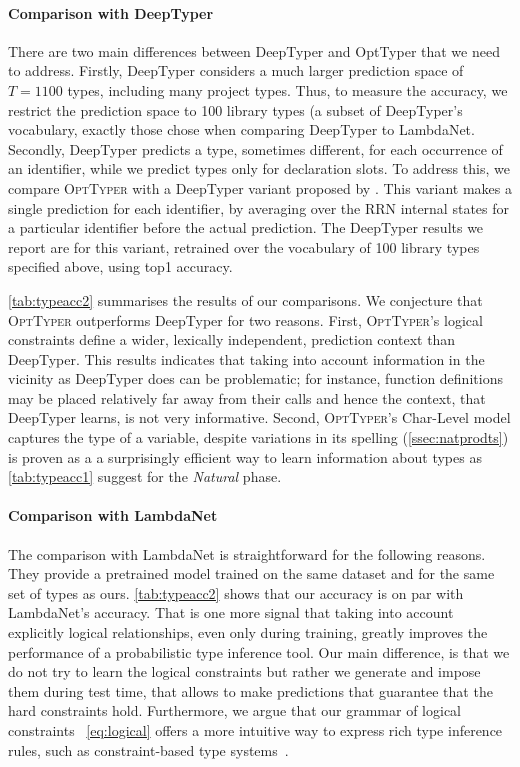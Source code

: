 \documentclass[acmsmall, review, anonymous]{acmart}\settopmatter{printfolios=true,printccs=false,printacmref=false}
\newcommand{\projectname}{\textsc{OptTyper}\xspace}
\begin{document}
\paragraph{Comparison with DeepTyper}
There are two main differences between DeepTyper 
and OptTyper that we need to address. Firstly, DeepTyper considers a much larger prediction space of $T=1100$ types, including many project types. Thus, to measure the accuracy, we restrict the prediction space to 100 library types (a subset of DeepTyper's vocabulary, exactly those \citet{wei20} chose when comparing DeepTyper to LambdaNet.
Secondly, DeepTyper predicts a type, sometimes different, for each occurrence of an identifier, while we predict types only for declaration slots. To address this, we compare \projectname{} with a DeepTyper variant proposed by \cite{wei20}.
This variant makes a single prediction for each identifier, by averaging over the RRN internal states for a particular identifier before the actual prediction.
The DeepTyper results we report are for this variant, retrained over the vocabulary of 100 library types specified above, using top1 accuracy.

\cref{tab:typeacc2} summarises the results of our comparisons. We conjecture that \projectname outperforms DeepTyper for two reasons. First, \projectname's logical constraints define
a wider, lexically independent, prediction context than DeepTyper. This results indicates that taking into account information in the vicinity as DeepTyper does can be problematic; for instance,
function definitions may be placed relatively far away from their calls and hence the context, that DeepTyper learns, is not very informative. Second, \projectname's Char-Level model captures the type of a variable, despite variations 
in its spelling (\cref{ssec:natprodts}) is proven as a a surprisingly efficient way to learn information about types as \cref{tab:typeacc1} suggest for the \textit{Natural} phase.   


\paragraph{Comparison with LambdaNet}
The comparison with LambdaNet is straightforward
for the following reasons. 
They provide a pretrained model trained on the same dataset and for the same set of types as ours. 
\cref{tab:typeacc2} shows that  
our accuracy is on par with LambdaNet's accuracy.
That is one more signal that taking into account explicitly logical relationships, even only during training,
greatly improves the performance of a probabilistic
type inference tool. Our main difference, is that
we do not try to learn the logical constraints but rather we generate and impose them during test time, that allows to make predictions that guarantee that the
hard constraints hold. Furthermore, we argue that our grammar of logical constraints ~\eqref{eq:logical}
offers a more intuitive way to express rich type inference rules, such as 
constraint-based type systems~\citep{odersky99,pottier05}.
\end{document}
